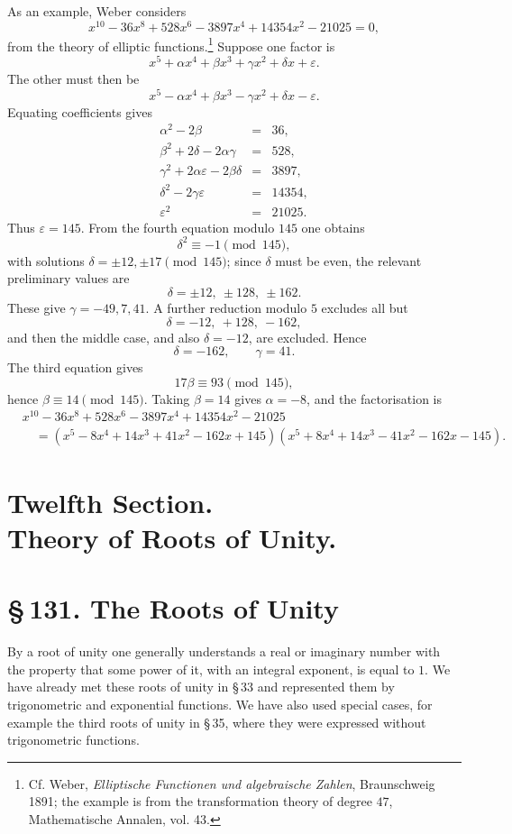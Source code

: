\documentclass[11pt]{article}
\providecommand{\sect}[2]{\section*{\S\,#1. #2}}
\begin{document}
As an example, Weber considers
\[
        x^{10}-36x^8+528x^6-3897x^4+14354x^2-21025=0,
\]
from the theory of elliptic functions.\footnote{Cf. Weber, \emph{Elliptische Functionen und algebraische Zahlen}, Braunschweig 1891; the example is from the transformation theory of degree $47$, Mathematische Annalen, vol. 43.} Suppose one factor is
\[
        x^5+\alpha x^4+\beta x^3+\gamma x^2+\delta x+\varepsilon.
\]
The other must then be
\[
        x^5-\alpha x^4+\beta x^3-\gamma x^2+\delta x-\varepsilon.
\]
Equating coefficients gives
\[
\begin{array}{rcl}
\alpha^2-2\beta&=&36,\\
\beta^2+2\delta-2\alpha\gamma&=&528,\\
\gamma^2+2\alpha\varepsilon-2\beta\delta&=&3897,\\
\delta^2-2\gamma\varepsilon&=&14354,\\
\varepsilon^2&=&21025.
\end{array}
\]
Thus $\varepsilon=145$. From the fourth equation modulo $145$ one obtains
\[
        \delta^2\equiv -1\pmod{145},
\]
with solutions $\delta=\pm12,\pm17\pmod{145}$; since $\delta$ must be even, the relevant preliminary values are
\[
        \delta=\pm12,\ \pm128,\ \pm162.
\]
These give $\gamma=-49,7,41$. A further reduction modulo $5$ excludes all but
\[
        \delta=-12,\ +128,\ -162,
\]
and then the middle case, and also $\delta=-12$, are excluded. Hence
\[
        \delta=-162,\qquad \gamma=41.
\]
The third equation gives
\[
        17\beta\equiv93\pmod{145},
\]
hence $\beta\equiv14\pmod{145}$. Taking $\beta=14$ gives $\alpha=-8$, and the factorisation is
\[
\begin{aligned}
&x^{10}-36x^8+528x^6-3897x^4+14354x^2-21025\\
&\quad=(x^5-8x^4+14x^3+41x^2-162x+145)
       (x^5+8x^4+14x^3-41x^2-162x-145).
\end{aligned}
\]

\section*{Twelfth Section.\\Theory of Roots of Unity.}

\sect{131}{The Roots of Unity}

By a root of unity one generally understands a real or imaginary number with the property that some power of it, with an integral exponent, is equal to $1$. We have already met these roots of unity in \S\,33 and represented them by trigonometric and exponential functions. We have also used special cases, for example the third roots of unity in \S\,35, where they were expressed without trigonometric functions.
\end{document}
